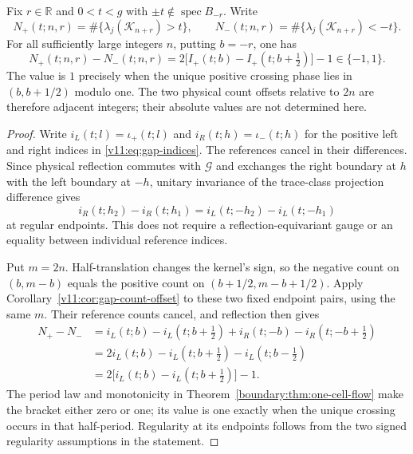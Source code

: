 \begin{theorem}
\label{interaction:thm:signed-count-imbalance}
Fix $r\in\mathbb R$ and $0<t<g$ with
$\pm t\notin\operatorname{spec}B_{-r}$. Write
\[
 N_+(t;n,r)=\#\{\lambda_j(\mathcal K_{n+r})>t\},\qquad
 N_-(t;n,r)=\#\{\lambda_j(\mathcal K_{n+r})<-t\}.
\]
For all sufficiently large integers $n$, putting $b=-r$, one has
\[
 N_+(t;n,r)-N_-(t;n,r)
 =2\bigl[I_+(t;b)-I_+(t;b+\tfrac12)\bigr]-1
 \in\{-1,1\}.
\]
The value is $1$ precisely when the unique positive crossing phase
lies in $(b,b+1/2)$ modulo one. The two physical count offsets relative
to $2n$ are therefore adjacent integers; their absolute values are
not determined here.
\end{theorem}
\begin{proof}
Write $i_L(t;l)=\iota_+(t;l)$ and
$i_R(t;h)=\iota_-(t;h)$ for the positive left and right indices in
\eqref{v11:eq:gap-indices}. The references cancel in their differences.
Since physical reflection commutes with $\mathcal G$ and exchanges the
right boundary at $h$ with the left boundary at $-h$, unitary invariance
of the trace-class projection difference gives
\[
 i_R(t;h_2)-i_R(t;h_1)
 =i_L(t;-h_2)-i_L(t;-h_1)
\]
at regular endpoints. This does not require a reflection-equivariant
gauge or an equality between individual reference indices.

Put $m=2n$. Half-translation changes the kernel's sign, so the negative
count on $(b,m-b)$ equals the positive count on
$(b+1/2,m-b+1/2)$. Apply
Corollary~\ref{v11:cor:gap-count-offset} to these two fixed endpoint
pairs, using the same $m$. Their reference counts cancel, and reflection
then gives
\begin{align*}
 N_+-N_-
 &=i_L(t;b)-i_L(t;b+\tfrac12)
     +i_R(t;-b)-i_R(t;-b+\tfrac12)\\
 &=2i_L(t;b)-i_L(t;b+\tfrac12)-i_L(t;b-\tfrac12)\\
 &=2\bigl[i_L(t;b)-i_L(t;b+\tfrac12)\bigr]-1.
\end{align*}
The period law and monotonicity in
Theorem~\ref{boundary:thm:one-cell-flow} make the bracket either zero
or one; its value is one exactly when the unique crossing occurs in
that half-period. Regularity at its endpoints follows from the two
signed regularity assumptions in the statement.
\end{proof}

